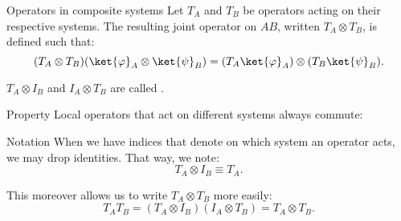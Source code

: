 \documentclass[a4paper]{article}
\begin{document}
\begin{parag}{Operators in composite systems}
    Let $T_A$ and $T_B$ be operators acting on their respective systems. The resulting joint operator on $AB$, written $T_A \otimes T_B$, is defined such that: 
    \[\left(T_A \otimes T_B\right) \left(\ket{\phi}_A \otimes \ket{\psi}_B\right) = \left(T_A \ket{\phi}_A\right) \otimes \left(T_B \ket{\psi}_B\right).\]

    $T_A \otimes I_B$ and $I_A \otimes T_B$ are called . 

    \begin{subparag}{Property}
        Local operators that act on different systems always commute: 
    \end{subparag}
    
    \begin{subparag}{Notation}
        When we have indices that denote on which system an operator acts, we may drop identities. That way, we note: 
        \[T_A \otimes I_B \equiv T_A.\]

        This moreover allows us to write $T_A \otimes T_B$ more easily: 
        \[T_A T_B = \left(T_A \otimes I_B\right) \left(I_A \otimes T_B\right) = T_A \otimes T_B.\]
    \end{subparag}
\end{parag}
\end{document}
